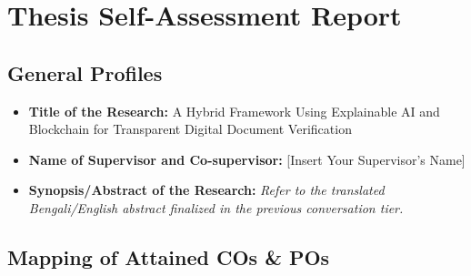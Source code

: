\chapter{Thesis Self-Assessment Report}

\section{General Profiles}
\begin{itemize}
    \item \textbf{Title of the Research:} A Hybrid Framework Using Explainable AI and Blockchain for Transparent Digital Document Verification
    \item \textbf{Name of Supervisor and Co-supervisor:} [Insert Your Supervisor's Name]
    \item \textbf{Synopsis/Abstract of the Research:} \textit{Refer to the translated Bengali/English abstract finalized in the previous conversation tier.}
\end{itemize}

\section{Mapping of Attained COs \& POs}


